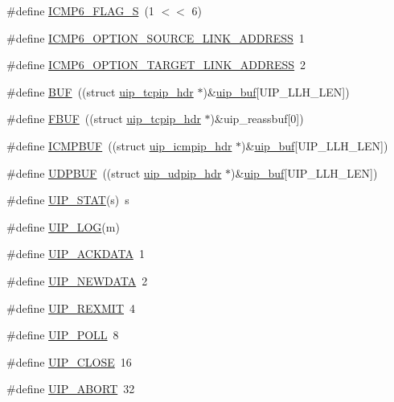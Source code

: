 \begin{DoxyCompactItemize}
\#define \hyperlink{group__uip_ga1d3211dbbdfb22d6a47b60dddcf945e8}{ICMP6\_\-FLAG\_\-S}~(1 $<$$<$ 6)
\item 
\#define \hyperlink{group__uip_ga42288d5c3cf4b10becefec657f441e54}{ICMP6\_\-OPTION\_\-SOURCE\_\-LINK\_\-ADDRESS}~1
\item 
\#define \hyperlink{group__uip_ga8387881de3a8bfd3c0d57b9d04ac9b7e}{ICMP6\_\-OPTION\_\-TARGET\_\-LINK\_\-ADDRESS}~2
\item 
\#define \hyperlink{group__uip_ga24f52ac52d6e714cb04a5aa01be3bdd0}{BUF}~((struct \hyperlink{structuip__tcpip__hdr}{uip\_\-tcpip\_\-hdr} $\ast$)\&\hyperlink{group__uipdevfunc_gab81e78f890dbbee50c533a9734b74fd9}{uip\_\-buf}\mbox{[}UIP\_\-LLH\_\-LEN\mbox{]})
\item 
\#define \hyperlink{group__uip_ga96544dedc1cdc71ad2ad54bf1d5e5433}{FBUF}~((struct \hyperlink{structuip__tcpip__hdr}{uip\_\-tcpip\_\-hdr} $\ast$)\&uip\_\-reassbuf\mbox{[}0\mbox{]})
\item 
\#define \hyperlink{group__uip_ga4309376690872fa4beb4f025f5cc199b}{ICMPBUF}~((struct \hyperlink{structuip__icmpip__hdr}{uip\_\-icmpip\_\-hdr} $\ast$)\&\hyperlink{group__uipdevfunc_gab81e78f890dbbee50c533a9734b74fd9}{uip\_\-buf}\mbox{[}UIP\_\-LLH\_\-LEN\mbox{]})
\item 
\#define \hyperlink{group__uip_gab9435261753469accec0c9bf8a5a2686}{UDPBUF}~((struct \hyperlink{structuip__udpip__hdr}{uip\_\-udpip\_\-hdr} $\ast$)\&\hyperlink{group__uipdevfunc_gab81e78f890dbbee50c533a9734b74fd9}{uip\_\-buf}\mbox{[}UIP\_\-LLH\_\-LEN\mbox{]})
\item 
\#define \hyperlink{group__uip_ga9c0814ed491fa452ec97910c0728d410}{UIP\_\-STAT}(s)~s
\item 
\#define \hyperlink{group__uip_ga013c3a06a8b58589a77f4a3442f89c2a}{UIP\_\-LOG}(m)
\item 
\#define \hyperlink{group__uip_ga6bfa488f87f68a6f7f4a3efb9e45eaf8}{UIP\_\-ACKDATA}~1
\item 
\#define \hyperlink{group__uip_ga39ce739bd352d7e348e37395ce903e43}{UIP\_\-NEWDATA}~2
\item 
\#define \hyperlink{group__uip_gaf848ce44c810492e7a35c2d23a429f45}{UIP\_\-REXMIT}~4
\item 
\#define \hyperlink{group__uip_gaf0ed78fd2be24d849cdd5af75e3b2674}{UIP\_\-POLL}~8
\item 
\#define \hyperlink{group__uip_ga57e6dc1d58a36d0ed53a3dd29ccc5798}{UIP\_\-CLOSE}~16
\item 
\#define \hyperlink{group__uip_gaa4c4310e54f18541b09e1e251fe7b22d}{UIP\_\-ABORT}~32
$$
\end{DoxyCompactItemize}
